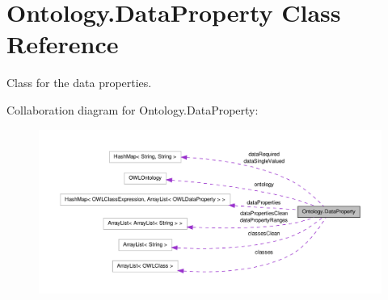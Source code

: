 \hypertarget{class_ontology_1_1_data_property}{
\section{Ontology.DataProperty Class Reference}
\label{class_ontology_1_1_data_property}
}


Class for the data properties.  




Collaboration diagram for Ontology.DataProperty:\nopagebreak
\begin{figure}[H]
\begin{center}
\leavevmode
\includegraphics[width=400pt]{class_ontology_1_1_data_property__coll__graph}
\end{center}
\end{figure}
